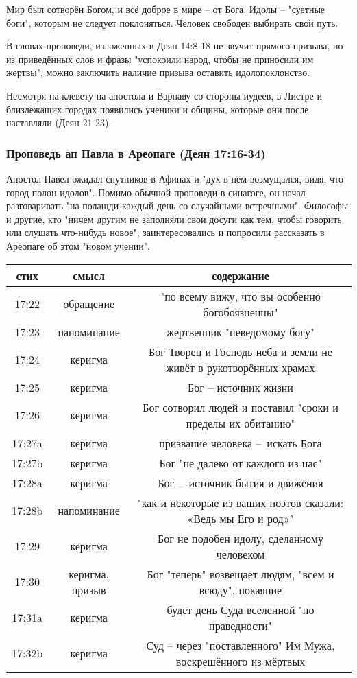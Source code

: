 Мир был сотворён Богом, и всё доброе в мире – от Бога. 
Идолы – "суетные боги", которым не следует поклоняться.
Человек свободен выбирать свой путь.

В словах проповеди, изложенных в Деян 14:8-18 не звучит прямого призыва, но из приведённых слов и фразы "успокоили народ, чтобы не приносили им жертвы", можно заключить наличие призыва оставить идолопоклонство.

Несмотря на клевету на апостола и Варнаву со стороны иудеев, в Листре и близлежащих городах появились ученики и общины, которые они после наставляли (Деян 21-23).

\subsubsection*{Проповедь ап Павла в Ареопаге (Деян 17:16-34)}

Апостол Павел ожидал спутников в Афинах и "дух в нём возмущался, видя, что город полон идолов".
Помимо обычной проповеди в синагоге, он начал разговаривать "на полащди каждый день со случайными встречными".
Философы и другие, кто "ничем другим не заполняли свои досуги как тем, чтобы говорить или слушать что-нибудь новое", заинтересовались и попросили рассказать в Ареопаге об этом "новом учении".

\begin{center}
	\begin{tabular}{ |c|c|c| }
		\hline
		стих & смысл & содержание \\
		\hline\hline
		17:22 & обращение & "по всему вижу, что вы особенно богобоязненны" \\
		17:23 & напоминание & жертвенник "неведомому богу" \\
		17:24 & керигма & Бог Творец и Господь неба и земли не живёт в рукотворённых храмах \\
		17:25 & керигма & Бог – источник жизни \\
		17:26 & керигма & Бог сотворил людей и поставил "сроки и пределы их обитанию" \\
		17:27a & керигма & призвание человека – искать Бога \\
		17:27b & керигма & Бог "не далеко от каждого из нас" \\
		17:28a & керигма & Бог – источник бытия и движения \\
		17:28b & напоминание & "как и некоторые из ваших поэтов сказали: «Ведь мы Его и род»" \\
		17:29 & керигма & Бог не подобен идолу, сделанному человеком \\
		17:30 & керигма, призыв & Бог "теперь" возвещает людям, "всем и всюду", покаяние \\
		17:31a & керигма & будет день Суда вселенной "по праведности" \\
		17:32b & керигма & Суд – через "поставленного" Им Мужа, воскрешённого из мёртвых \\
		\hline
	\end{tabular}
\end{center}


